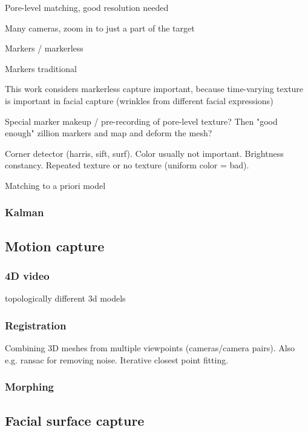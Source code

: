 Pore-level matching, good resolution needed

Many cameras, zoom in to just a part of the target

Markers / markerless

Markers traditional


This work considers markerless capture important, because time-varying texture is important in facial capture (wrinkles from different facial expressions)

Special marker makeup / pre-recording of pore-level texture? Then "good enough" zillion markers and map and deform the mesh?

Corner detector (harris, sift, surf). Color usually not important. Brightness constancy. Repeated texture or no texture (uniform color = bad).

Matching to a priori model

\subsubsection{Kalman}

\subsection{Motion capture}

\subsubsection{4D video}

topologically different 3d models

\subsubsection{Registration}

Combining 3D meshes from multiple viewpoints (cameras/camera pairs). Also e.g. ransac for removing noise. Iterative closest point fitting.


\subsubsection{Morphing}


\subsection{Facial surface capture}

